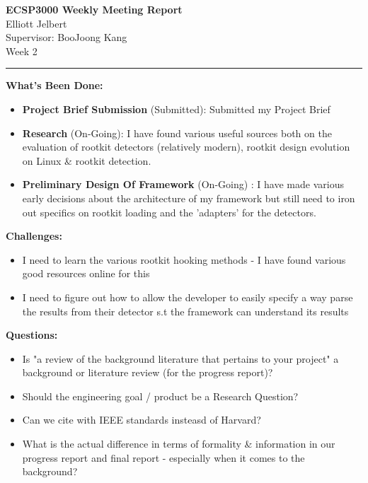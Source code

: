 \documentclass[5pt]{article}
\begin{document}
\begin{center}
    {\Large \textbf{ECSP3000 Weekly Meeting Report}} \\[1em] 
    Elliott Jelbert \\ 
    Supervisor: BooJoong Kang \\[0.5em]
    
    Week 2
    
    \vspace{1em} 
    
    \rule{\textwidth}{1pt}
\end{center}

\vspace{1.5em} 


\noindent \textbf{\large What's Been Done:}
\begin{itemize}[label=$\bullet$]
    \item \textbf{Project Brief Submission} (Submitted): Submitted my Project Brief
    \item \textbf{Research} (On-Going): I have found various useful sources both on the evaluation of rootkit detectors (relatively modern), rootkit design evolution on Linux \& rootkit detection. 
    \item \textbf{Preliminary Design Of Framework} (On-Going) : I have made various early decisions about the architecture of my framework but still need to iron out specifics on rootkit loading and the 'adapters' for the detectors.
\end{itemize}

\vspace{2em} 

\noindent \textbf{\large Challenges:}
\begin{itemize}[label=$\bullet$]
    \item I need to learn the various rootkit hooking methods - I have found various good resources online for this
    \item I need to figure out how to allow the developer to easily specify a way parse the results from their detector s.t the framework can understand its results
\end{itemize}

\vspace{2em} 

\noindent \textbf{\large Questions:}
\begin{itemize}[label=$\bullet$]
    \item Is "a review of the background literature that pertains to your project" a background or literature review (for the progress report)?
    \item Should the engineering goal / product be a Research Question?
    \item Can we cite with IEEE standards insteasd of Harvard?
    \item What is the actual difference in terms of formality \& information in our progress report and final report - especially when it comes to the background?
\end{itemize}
\end{document}
